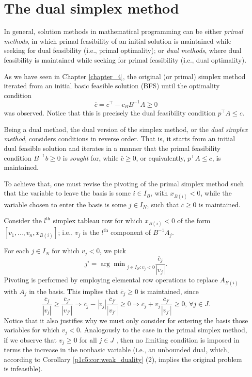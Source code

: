 \section{The dual simplex method}


In general, solution methods in mathematical programming can be either \emph{primal methods}, in which primal feasibility of an initial solution is maintained while seeking for dual feasibility (i.e., primal optimality); or \emph{dual methods}, where dual feasibility is maintained while seeking for primal feasibility (i.e., dual optimality).

As we have seen in Chapter \ref{chapter_4}, the original (or primal) simplex method iterated from an initial basic feasible solution (BFS) until the optimality condition 
%
\begin{equation*}
	\overline{c} = c^\top - c_BB^{-1}A \geq 0
\end{equation*}
%
was observed. Notice that this is precisely the dual feasibility condition $p^\top A \leq c$. 

Being a dual method, the dual version of the simplex method, or the \emph{dual simplex method}, considers conditions in reverse order. That is, it starts from an initial dual feasible solution and iterates in a manner that the primal feasibility condition $B^{-1}b \geq 0$ is \emph{sought} for, while $\overline{c} \geq 0$, or equivalently, $p^\top A \leq c$, is maintained.

To achieve that, one must revise the pivoting of the primal simplex method such that the variable to leave the basis is some $i \in I_B$, with $x_{B(i)} < 0$, while the variable chosen to enter the basis is some $j \in I_N$, such that $\overline{c} \geq 0$ is maintained.

 Consider the $l^\text{th}$ simplex tableau row for which $x_{B(i)} < 0$ of the form $[v_1,\dots, v_n, x_{B(i)}]$; i.e., $v_j$ is the $l^\text{th}$ component of $B^{-1}A_j$.
	 
 For each $j \in I_N$ for which $v_j < 0$, we pick
 \begin{equation*}
 	j' = {\arg\min}_{j \in I_N : v_j < 0} \frac{\overline{c}_j}{|v_j|}.	
 \end{equation*}
 Pivoting is performed by employing elemental row operations to replace $A_{B(i)}$ with $A_j$ in the basis. This implies that $\overline{c}_j \geq 0$ is maintained, since
 \begin{equation*}
	\frac{\overline{c}_j}{|v_j|} \geq \frac{\overline{c}_{j'}}{|v_{j'}|} \Rightarrow \overline{c}_j -|v_j|\frac{\overline{c}_{j'}}{|v_{j'}|} \geq 0 \Rightarrow \overline{c}_j + v_j\frac{\overline{c}_{j'}}{|v_{j'}|} \geq 0, \, \forall j \in J.
 \end{equation*}
%
Notice that it also justifies why we must only consider for entering the basis those variables for which $v_j < 0$. Analogously to the case in the primal simplex method, if we observe that $v_j \ge 0$ for all $j \in J$ , then no limiting condition is imposed in terms the increase in the nonbasic variable (i.e., an unbounded dual, which, according to Corollary \ref{p1c5:cor:weak_duality} (2), implies the original problem is infeasible).


